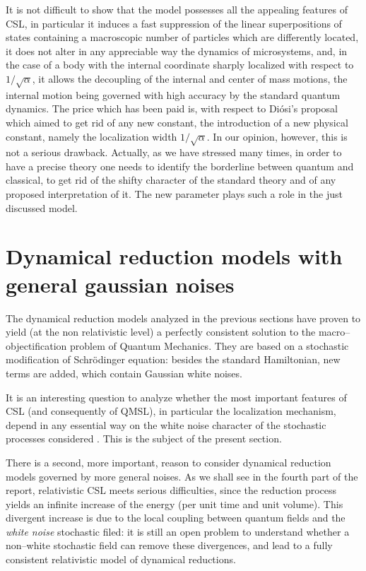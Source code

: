 \documentclass[10pt,a4paper]{article}
\begin{document}
It is not difficult to show that  the model possesses all the
appealing features of CSL, in particular it induces a fast
suppression of the linear superpositions of states containing a
macroscopic number of particles which are differently located, it
does not alter in any appreciable way the dynamics of
microsystems, and, in the case of a body with the internal
coordinate sharply localized with respect to $1/\sqrt{\alpha}$, it
allows the decoupling of the internal and center of mass motions,
the internal motion being governed with high accuracy by the
standard quantum dynamics. The price which has been paid is, with
respect to Di\'osi's proposal which aimed to get rid of any new
constant, the introduction of a new physical constant, namely the
localization width $1/\sqrt{\alpha}$. In our opinion, however,
this is not a serious drawback. Actually, as we have stressed many
times, in order to have a precise theory one needs to identify the
borderline between quantum and classical, to get rid of the shifty
character of the standard theory and of any proposed
interpretation of it. The new parameter plays such a role in the
just discussed model.



\section{Dynamical reduction models with general gaussian noises}
\label{nsec}

The dynamical reduction models analyzed in the previous sections
have proven to yield (at the non relativistic level) a perfectly
consistent solution to the macro--objectification problem of
Quantum Mechanics. They are based on a stochastic modification of
Schr\"odinger equation: besides the standard Hamiltonian, new
terms are added, which contain Gaussian white noises.

It is an interesting question to analyze whether the most
important features of CSL (and consequently of QMSL), in
particular the localization mechanism, depend in any essential way
on the white noise character of the stochastic processes
considered \cite{pero, p1wq, gi2wq, gi2}. This is the subject of
the present section.

There is a second, more important, reason to consider dynamical
reduction models governed by more general noises. As we shall see
in the fourth part of the report, relativistic CSL meets serious
difficulties, since the reduction process yields an infinite
increase of the energy (per unit time and unit volume). This
divergent increase is due to the local coupling between quantum
fields and the {\it white noise} stochastic filed: it is still an
open problem to understand whether a non--white stochastic field
can remove these divergences, and lead to a fully consistent
relativistic model of dynamical reductions.
\end{document}
